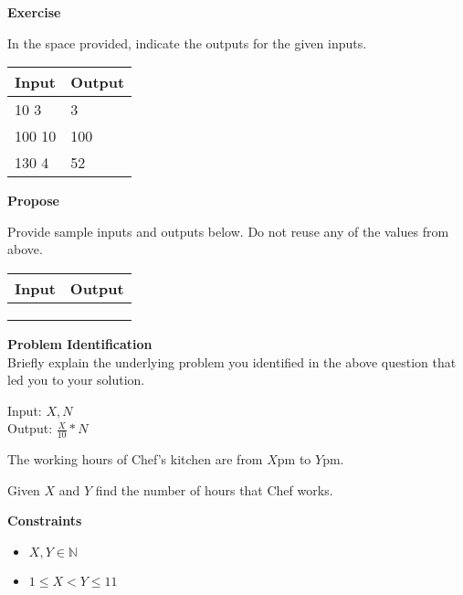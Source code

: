 \documentclass[a4paper]{exam}
\newcommand\heading[1]{\textbf{#1}}
\begin{document}
\begin{questions}
    \heading{Exercise}

    In the space provided, indicate the outputs for the given inputs.

    \begin{tabularx}{\textwidth}{|X|X|}
        \rowcolor{gray!50}
        \hline
        Input  & Output \\ \hline\hline
        10 3   & 3      \\\hline
        100 10 & 100    \\\hline
        130 4  & 52     \\\hline
    \end{tabularx}

    \heading{Propose}

    Provide sample inputs and outputs below. Do not reuse any of the values from above.

    \begin{tabularx}{\textwidth}{|X|X|}
        \rowcolor{gray!50}
        \hline
        Input & Output \\ \hline\hline
              &        \\\hline
              &        \\\hline
              &        \\\hline
    \end{tabularx}

    \heading{Problem Identification}\\
    Briefly explain the underlying problem you identified in the above question that led you to your solution.

    \begin{mdframed}
      Input: $X,N$\\
      Output: $\frac{X}{10}*N$\\
    \end{mdframed}


    The working hours of Chef's kitchen are from $X$pm to $Y$pm.

    Given $X$ and $Y$ find the number of hours that Chef works.

    \heading{Constraints}
    \begin{itemize}
        \item $X,Y \in \mathbb{N}$
        \item $1 \le X < Y \le 11$
    \end{itemize}



\end{questions}
\end{document}

